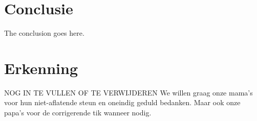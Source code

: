 \documentclass[conference]{IEEEtran}
\begin{document}
\section{Conclusie}
The conclusion goes here.






\section*{Erkenning}

NOG IN TE VULLEN OF TE VERWIJDEREN
We willen graag onze mama's voor hun niet-aflatende steun en oneindig geduld bedanken. Maar ook onze papa's voor de corrigerende tik wanneer nodig.







%
%
%
\nocite{baldwin1956optimum,bain1992introduction,kendall2003evolution}



%
%



\end{document}
